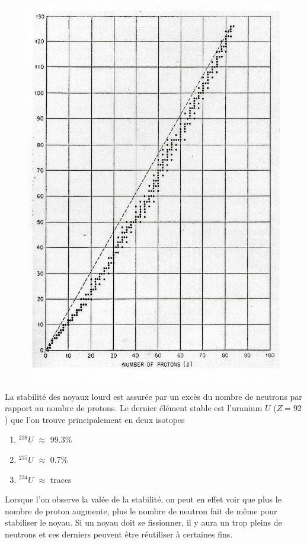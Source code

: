 	\begin{figure}
	\vspace{-5mm}
	\includegraphics[scale=0.13]{ch1/image1.png}
	\end{figure}
La stabilité des noyaux lourd est assurée par un excès du nombre de neutrons par rapport au 
nombre de protons. Le dernier élément stable est l'uranium $U$ ($Z=92$) que l'on trouve 
principalement en deux isotopes
\begin{enumerate}
\item $ ^{238}U$ $\approx$ 99.3\%
\item $ ^{235}U$ $\approx$ 0.7\%
\item $ ^{234}U$ $\approx$ traces
\end{enumerate}
Lorsque l'on observe la valée de la stabilité, on peut en effet voir que plus le nombre de 
proton augmente, plus le nombre de neutron fait de même pour stabiliser le noyau. Si un 
noyau doit se fissionner, il y aura un trop pleins de neutrons et ces derniers peuvent 
être réutiliser à certaines fins.\\ 
\\


